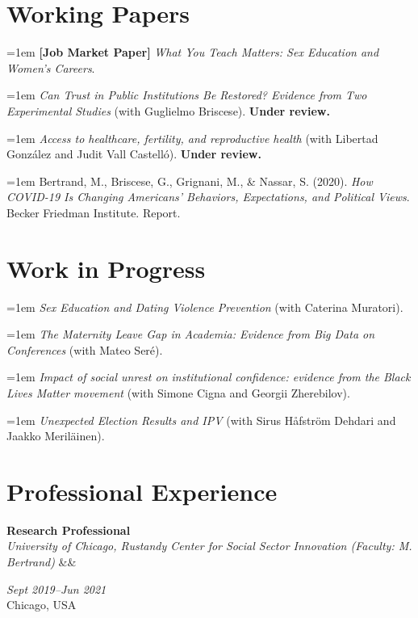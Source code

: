\documentclass[11pt, a4paper]{article}
\newcommand{\cventry}[5]{%
  \begin{minipage}[t]{0.78\textwidth}
    \textbf{#1}\\[-2pt]
    \textit{\small #2}%
    \ifx&#5&\else\\[1pt]{\small #5}\fi
  \end{minipage}%
  \hfill%
  \begin{minipage}[t]{0.2\textwidth}
    \raggedleft\small
    \textit{#4}\\
    #3
  \end{minipage}%
  \par\vspace{5pt}%
}
\newcommand{\cvpub}[1]{%
  \hangindent=1em%
  {\small #1}\par\vspace{4pt}%
}
\begin{document}
\section{Working Papers}

\cvpub{\textbf{[Job Market Paper]} \textit{What You Teach Matters: Sex Education and Women’s Careers}.}

\cvpub{\textit{Can Trust in Public Institutions Be Restored? Evidence from Two Experimental Studies}
  (with Guglielmo Briscese). \textbf{Under review.}}

\cvpub{\textit{Access to healthcare, fertility, and reproductive health}
  (with Libertad González and Judit Vall Castelló). \textbf{Under review.}}

\cvpub{Bertrand, M., Briscese, G., Grignani, M., \& Nassar, S. (2020).
  \textit{How COVID-19 Is Changing Americans' Behaviors, Expectations, and Political Views}.
  Becker Friedman Institute. Report.}

\section{Work in Progress}

\cvpub{\textit{Sex Education and Dating Violence Prevention}
  (with Caterina Muratori).}

\cvpub{\textit{The Maternity Leave Gap in Academia: Evidence from Big Data on Conferences}
  (with Mateo Seré).}

\cvpub{\textit{Impact of social unrest on institutional confidence: evidence from the Black Lives Matter movement} (with Simone Cigna and Georgii Zherebilov).}

\cvpub{\textit{Unexpected Election Results and IPV}
  (with Sirus Håfström Dehdari and Jaakko Meriläinen).}

\section{Professional Experience}

\cventry{Research Professional}%
  {University of Chicago, Rustandy Center for Social Sector Innovation \textmd{(Faculty: M. Bertrand)}}%
  {Chicago, USA}{Sept 2019--Jun 2021}{}%
\end{document}
